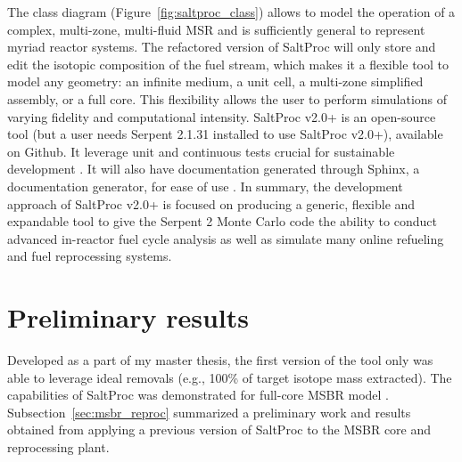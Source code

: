 The class diagram (Figure~\ref{fig:saltproc_class}) allows to model the 
operation of a complex, multi-zone, multi-fluid \gls{MSR} and is sufficiently 
general to represent myriad reactor systems. The refactored version of 
SaltProc will only store and edit the isotopic composition of the fuel stream, 
which makes it a flexible tool to model any geometry: an infinite medium, a 
unit cell, a multi-zone simplified assembly, or a full core. This flexibility 
allows the user to perform simulations of varying fidelity and computational 
intensity. SaltProc v2.0+ is an open-source tool (but a user needs Serpent 
2.1.31 installed to use SaltProc v2.0+), available on Github. It leverage unit 
and continuous tests  crucial for sustainable development  
\cite{krekel_pytest_2004}. It will also have documentation generated through 
Sphinx, a documentation generator, for ease of use \cite{brandl_sphinx_2009}. 
In summary, the development approach of SaltProc v2.0+ is focused on producing 
a generic, flexible and expandable tool to give the Serpent 2 Monte Carlo code 
the ability to conduct advanced in-reactor fuel cycle analysis as well as 
simulate many online refueling and fuel reprocessing systems.


\section{Preliminary results}\label{sec:pre-results-msbr}
Developed as a part of my master thesis, the first version of the tool only 
was able to leverage ideal removals (e.g., 100\% of target isotope mass 
extracted). The capabilities of SaltProc was demonstrated for full-core 
\gls{MSBR} model \cite{rykhlevskii_full-core_2017,rykhlevskii_modeling_2019}.
Subsection~\ref{sec:msbr_reproc} summarized a preliminary work and results 
obtained from applying a previous version of SaltProc to the \gls{MSBR} core 
and reprocessing plant.

